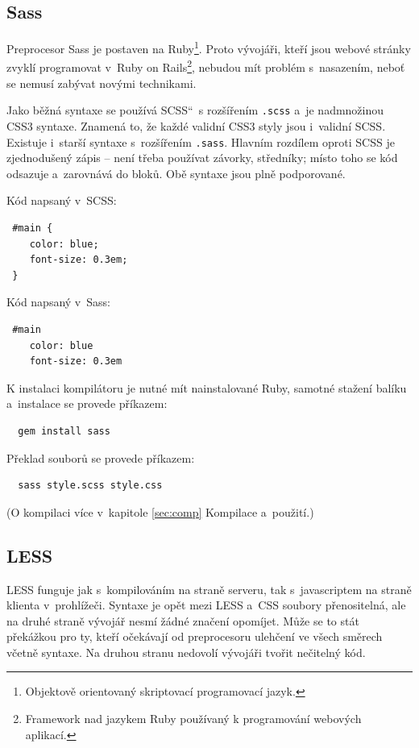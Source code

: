 \documentclass[thesis=B,czech]{FITthesis}[2012/06/26]
\begin{document}
\subsection{Sass}

Preprocesor Sass je postaven na Ruby\footnote{Objektově orientovaný skriptovací programovací jazyk.}. Proto vývojáři, kteří jsou webové stránky zvyklí programovat v~Ruby on Rails\footnote{Framework nad jazykem Ruby používaný k programování webových aplikací.}, nebudou mít problém s~nasazením, neboť se nemusí zabývat novými technikami. 

Jako běžná syntaxe se používá \quotedblbase SCSS\textquotedblleft   ~s rozšířením \verb#.scss# a~je nadmnožinou CSS3 syntaxe. Znamená to, že každé validní CSS3 styly jsou i~validní SCSS. Existuje i~starší syntaxe s~rozšířením \verb#.sass#. Hlavním rozdílem oproti SCSS je zjednodušený zápis -- není třeba používat závorky, středníky; místo toho se kód odsazuje a~zarovnává do bloků. Obě syntaxe jsou plně podporované.

\noindent Kód napsaný v~SCSS:
\scriptsize
\begin{verbatim}
 #main {
    color: blue;
    font-size: 0.3em;
 }
\end{verbatim}
\normalsize
Kód napsaný v~Sass:
\scriptsize
\begin{verbatim}
 #main
    color: blue
    font-size: 0.3em
\end{verbatim}
\normalsize
K instalaci kompilátoru je nutné mít nainstalované Ruby, samotné stažení balíku a~instalace se provede příkazem:
\scriptsize
\begin{verbatim}
  gem install sass
\end{verbatim}
\normalsize
Překlad souborů se provede příkazem:
\scriptsize
\begin{verbatim}
  sass style.scss style.css
\end{verbatim}
\normalsize
(O kompilaci více v~kapitole \ref{sec:comp} Kompilace a~použití.)

\subsection{LESS}

LESS funguje jak s~kompilováním na straně serveru, tak s~javascriptem na straně klienta v~prohlížeči. Syntaxe je opět mezi LESS a~CSS soubory přenositelná, ale na druhé straně vývojář nesmí žádné značení opomíjet. Může se to stát překážkou pro ty, kteří očekávají od preprocesoru ulehčení ve všech směrech včetně syntaxe. Na druhou stranu nedovolí vývojáři tvořit nečitelný kód.
\end{document}
